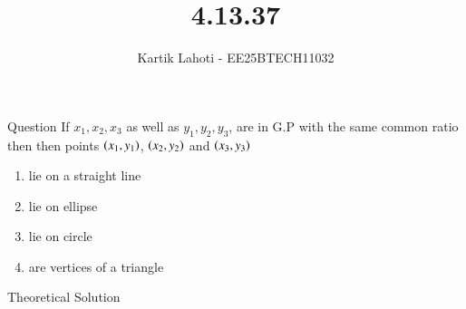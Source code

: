 \documentclass{beamer}
\title %
{4.13.37}
\author 
{Kartik Lahoti - EE25BTECH11032}
\begin{document}
\frame{\titlepage}
\begin{frame}{Question}
If $x_1 , x_2 , x_3$ as well as $y_1 , y_2 ,y _3$, are in G.P with the same common ratio then then points $\left(x_1 , y_1\right)$, $\left(x_2 , y_2\right)$ and $\left(x_3 , y_3\right)$
\begin{multicols}
\begin{enumerate}
        \item lie on a straight line
        \item lie on ellipse 
        \item lie on circle
        \item are vertices of a triangle
    
\end{enumerate}
\end{multicols}
\end{frame}

\begin{frame}{Theoretical Solution}
    \begin{table}[]
        \centering
        
        \caption{$4.13.37$}
        \label{tab:1.0}
    \end{table}
\end{frame}
\end{document}

